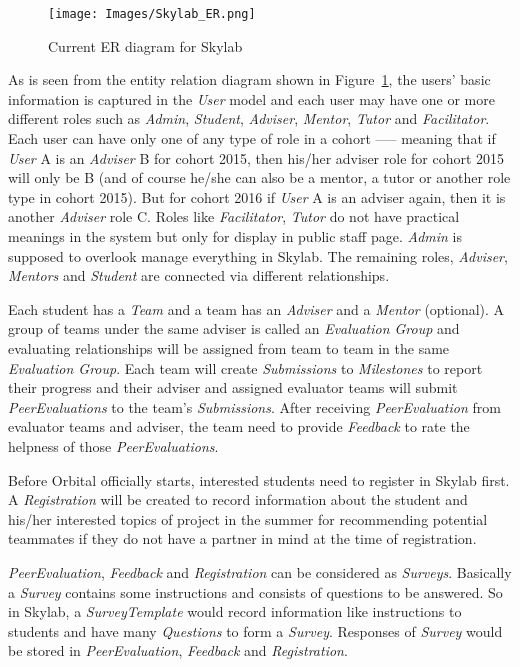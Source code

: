 \begin{figure}[h]
  \centering
  \texttt{[image: Images/Skylab\_ER.png]}
  \caption{Current ER diagram for Skylab}
  \label{fig:SkylabER}
\end{figure}

As is seen from the entity relation diagram shown in Figure~\ref{fig:SkylabER}, the users' basic information is captured in the \textit{User} model and each user may have one or more different roles such as \textit{Admin}, \textit{Student}, \textit{Adviser}, \textit{Mentor}, \textit{Tutor} and \textit{Facilitator}. Each user can have only one of any type of role in a cohort —-- meaning that if \textit{User} A is an \textit{Adviser} B for cohort 2015, then his/her adviser role for cohort 2015 will only be B (and of course he/she can also be a mentor, a tutor or another role type in cohort 2015). But for cohort 2016 if \textit{User} A is an adviser again, then it is another \textit{Adviser} role C. Roles like \textit{Facilitator}, \textit{Tutor} do not have practical meanings in the system but only for display in public staff page. \textit{Admin} is supposed to overlook manage everything in Skylab. The remaining roles, \textit{Adviser}, \textit{Mentors} and \textit{Student} are connected via different relationships.

Each student has a \textit{Team} and a team has an \textit{Adviser} and a \textit{Mentor} (optional). A group of teams under the same adviser is called an \textit{Evaluation Group} and evaluating relationships will be assigned from team to team in the same \textit{Evaluation Group}. Each team will create \textit{Submissions} to \textit{Milestones} to report their progress and their adviser and assigned evaluator teams will submit \textit{PeerEvaluations} to the team's \textit{Submissions}. After receiving \textit{PeerEvaluation} from evaluator teams and adviser, the team need to provide \textit{Feedback} to rate the helpness of those \textit{PeerEvaluations}.

Before Orbital officially starts, interested students need to register in Skylab first. A \textit{Registration} will be created to record information about the student and his/her interested topics of project in the summer for recommending potential teammates if they do not have a partner in mind at the time of registration.

\textit{PeerEvaluation}, \textit{Feedback} and \textit{Registration} can be considered as \textit{Surveys}. Basically a \textit{Survey} contains some instructions and consists of questions to be answered. So in Skylab, a \textit{SurveyTemplate} would record information like instructions to students and have many \textit{Questions} to form a \textit{Survey}. Responses of \textit{Survey} would be stored in \textit{PeerEvaluation}, \textit{Feedback} and \textit{Registration}.

